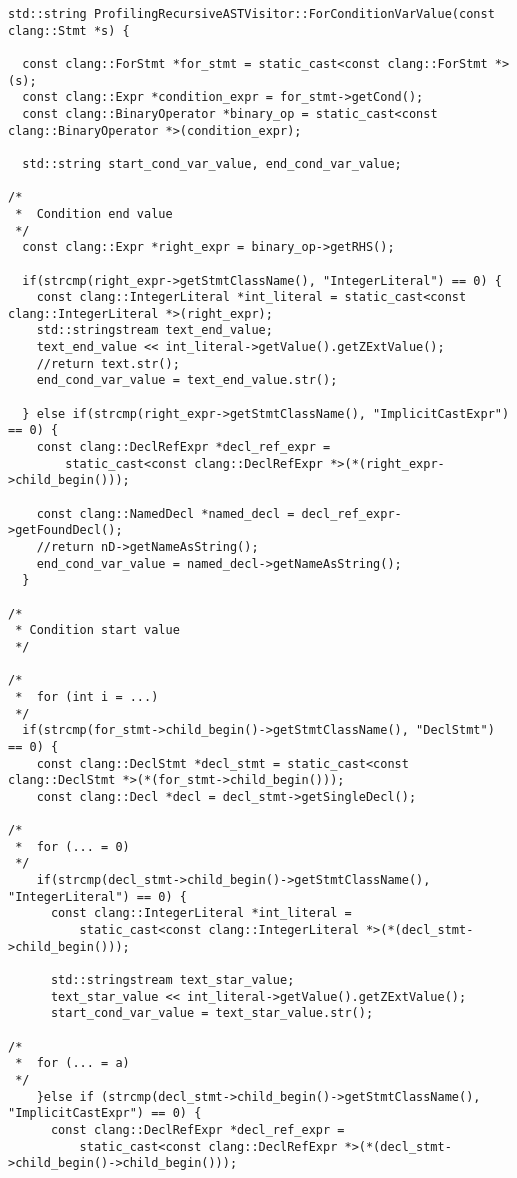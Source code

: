 \documentclass[a4paper,10pt,twoside]{book}
\begin{document}
\begin{lstlisting}[language=CCC, caption=driver/program.cpp]
std::string ProfilingRecursiveASTVisitor::ForConditionVarValue(const clang::Stmt *s) {

  const clang::ForStmt *for_stmt = static_cast<const clang::ForStmt *>(s);
  const clang::Expr *condition_expr = for_stmt->getCond();
  const clang::BinaryOperator *binary_op = static_cast<const clang::BinaryOperator *>(condition_expr);
  
  std::string start_cond_var_value, end_cond_var_value;

/*
 *  Condition end value
 */
  const clang::Expr *right_expr = binary_op->getRHS();

  if(strcmp(right_expr->getStmtClassName(), "IntegerLiteral") == 0) {
    const clang::IntegerLiteral *int_literal = static_cast<const clang::IntegerLiteral *>(right_expr);
    std::stringstream text_end_value;
    text_end_value << int_literal->getValue().getZExtValue();
    //return text.str();
    end_cond_var_value = text_end_value.str();

  } else if(strcmp(right_expr->getStmtClassName(), "ImplicitCastExpr") == 0) {
  	const clang::DeclRefExpr *decl_ref_expr = 
        static_cast<const clang::DeclRefExpr *>(*(right_expr->child_begin()));
  	
    const clang::NamedDecl *named_decl = decl_ref_expr->getFoundDecl();
  	//return nD->getNameAsString(); 
    end_cond_var_value = named_decl->getNameAsString();
  }

/*
 * Condition start value
 */

/*
 *  for (int i = ...)
 */
  if(strcmp(for_stmt->child_begin()->getStmtClassName(), "DeclStmt") == 0) {
    const clang::DeclStmt *decl_stmt = static_cast<const clang::DeclStmt *>(*(for_stmt->child_begin()));
    const clang::Decl *decl = decl_stmt->getSingleDecl();

/*
 *  for (... = 0)
 */
    if(strcmp(decl_stmt->child_begin()->getStmtClassName(), "IntegerLiteral") == 0) {      
      const clang::IntegerLiteral *int_literal = 
          static_cast<const clang::IntegerLiteral *>(*(decl_stmt->child_begin())); 
      
      std::stringstream text_star_value;
      text_star_value << int_literal->getValue().getZExtValue();
      start_cond_var_value = text_star_value.str();

/*
 *  for (... = a)
 */
    }else if (strcmp(decl_stmt->child_begin()->getStmtClassName(), "ImplicitCastExpr") == 0) {
      const clang::DeclRefExpr *decl_ref_expr = 
          static_cast<const clang::DeclRefExpr *>(*(decl_stmt->child_begin()->child_begin()));
      

\end{lstlisting}
\end{document}
